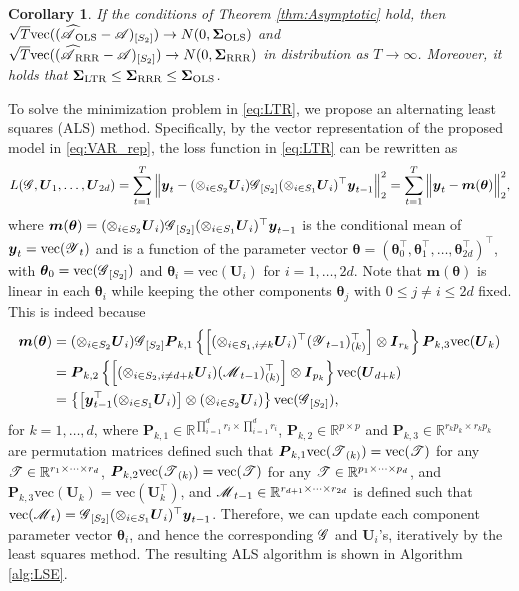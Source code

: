 \documentclass[12pt]{article}
\newtheorem{corollary}{Corollary}
\newcommand{\bm}{\boldsymbol}
\newcommand{\cm}[1]{\mbox{\boldmath$\mathscr{#1}$}}
\begin{document}
\begin{corollary}
	\label{cor:OLSRRR}
	If the conditions of Theorem \ref{thm:Asymptotic} hold, then $\sqrt{T}\textup{vec}((\cm{\widehat{A}}_{\textup{OLS}}-\cm{A})_{[S_2]})\to N(0,\bm{\Sigma}_{\textup{OLS}})$ and $\sqrt{T}\textup{vec}((\cm{\widehat{A}}_{\textup{RRR}}-\cm{A})_{[S_2]})\to N(0,\bm{\Sigma}_{\textup{RRR}})$ in distribution as $T\to\infty$. Moreover, it holds that $\bm{\Sigma}_{\textup{LTR}}\leq\bm{\Sigma}_{\textup{RRR}}\leq\bm{\Sigma}_{\textup{OLS}}$.
\end{corollary}

To solve the minimization problem in \eqref{eq:LTR}, we propose an alternating least squares (ALS) method. Specifically, by the vector representation  of the proposed model in \eqref{eq:VAR_rep}, the loss function in \eqref{eq:LTR} can be rewritten as
\[
L(\cm{G}, \bm{U}_1, \dots, \bm{U}_{2d})=\sum_{t=1}^T\Big\|\bm{y}_t-(\otimes_{i\in S_2}\bm{U}_i)\cm{G}_{[S_2]}(\otimes_{i\in S_1}\bm{U}_i)^\top\bm{y}_{t-1}\Big\|_2^2=\sum_{t=1}^T\Big\|\bm{y}_t-\bm{m}(\bm{\theta})\Big\|_2^2,
\]
where $\bm{m}(\bm{\theta})=(\otimes_{i\in S_2}\bm{U}_i)\cm{G}_{[S_2]}(\otimes_{i\in S_1}\bm{U}_i)^\top\bm{y}_{t-1}$ is the conditional mean of $\bm{y}_t=\text{vec}(\cm{Y}_t)$ and is a function of the parameter vector $\bm{\theta}=(\bm{\theta}_0^\top,\bm{\theta}_1^\top,\dots, \bm{\theta}_{2d}^\top)^\top$, with $\bm{\theta}_0=\text{vec}(\cm{G}_{[S_2]})$ and $\bm{\theta}_i=\text{vec}(\bm{U}_{i})$ for $i=1,\dots, 2d$.
Note that $\bm{m}(\bm{\theta})$ is linear in each $\bm{\theta}_i$ while keeping the other components $\bm{\theta}_j$ with $0\leq j\neq i \leq 2d$ fixed.  This is indeed because 
\begin{align}
\bm{m}(\bm{\theta})&=(\otimes_{i\in S_2}\bm{U}_i)\cm{G}_{[S_2]}\bm{P}_{k,1}\left\{\left[(\otimes_{i\in S_1,i\neq k}\bm{U}_i)^\top(\cm{Y}_{t-1})_{(k)}^\top\right]\otimes \bm{I}_{r_k}\right\}\bm{P}_{k,3}\text{vec}(\bm{U}_k)\\
&=\bm{P}_{k,2}\left\{\left[(\otimes_{i\in S_2,i\neq d+k}\bm{U}_{i})(\cm{M}_{t-1})_{(k)}^\top\right]\otimes\bm{I}_{p_{k}}\right\}\text{vec}(\bm{U}_{d+k})\\
&=\left\{\left[\bm{y}_{t-1}^\top(\otimes_{i\in S_1}\bm{U}_i)\right]\otimes(\otimes_{i\in S_2}\bm{U}_i)\right\}\text{vec}(\cm{G}_{[S_2]}),
\end{align}
for $k=1,\dots, d$, where $\bm{P}_{k,1}\in\mathbb{R}^{\prod_{i=1}^dr_i\times\prod_{i=1}^dr_i}$, $\bm{P}_{k,2}\in\mathbb{R}^{p\times p}$ and $\bm{P}_{k,3}\in\mathbb{R}^{r_kp_k\times r_kp_k}$ are permutation matrices defined such that $\bm{P}_{k,1}\text{vec}(\cm{T}_{(k)})=\text{vec}(\cm{T})$ for any  $\cm{T}\in\mathbb{R}^{r_1\times\cdots\times r_d}$,   $\bm{P}_{k,2}\text{vec}(\cm{T}_{(k)})=\text{vec}(\cm{T})$ for any $\cm{T}\in\mathbb{R}^{p_1\times\cdots\times p_d}$, and   $\bm{P}_{k,3}\text{vec}(\bm{U}_{k})=\text{vec}(\bm{U}_{k}^\top)$, and $\cm{M}_{t-1}\in\mathbb{R}^{r_{d+1}\times\cdots\times r_{2d}}$ is defined such that $\text{vec}(\cm{M}_t)=\cm{G}_{[S_2]}(\otimes_{i\in S_1}\bm{U}_i)^\top\bm{y}_{t-1}$. Therefore, we can update each component parameter vector $\bm{\theta}_i$, and hence the corresponding $\cm{G}$ and $\bm{U}_i$'s, iteratively by the least squares method.  The resulting ALS algorithm is shown in Algorithm  \ref{alg:LSE}.
\end{document}
